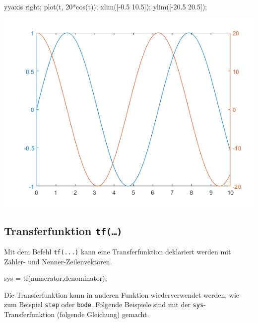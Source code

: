 \documentclass[
  10pt,
  a4paper,
  german]{article}
\newenvironment{Shaded}{}{}
\newcommand{\FloatTok}[1]{\textcolor[rgb]{0.00,0.36,0.77}{#1}}
\newcommand{\NormalTok}[1]{\textcolor[rgb]{0.14,0.16,0.18}{#1}}
\newcommand{\OperatorTok}[1]{\textcolor[rgb]{0.14,0.16,0.18}{#1}}
\newcommand{\VariableTok}[1]{\textcolor[rgb]{0.89,0.38,0.04}{#1}}
\numberwithin{equation}{section}
\begin{document}
\begin{multicols}{2}
\begin{Shaded}
\begin{Highlighting}[]
\VariableTok{yyaxis} \VariableTok{right}\OperatorTok{;}
\VariableTok{plot}\NormalTok{(}\VariableTok{t}\OperatorTok{,} \FloatTok{20}\OperatorTok{*}\VariableTok{cos}\NormalTok{(}\VariableTok{t}\NormalTok{))}\OperatorTok{;}
\VariableTok{xlim}\NormalTok{([}\OperatorTok{{-}}\FloatTok{0.5} \FloatTok{10.5}\NormalTok{])}\OperatorTok{;}
\VariableTok{ylim}\NormalTok{([}\OperatorTok{{-}}\FloatTok{20.5} \FloatTok{20.5}\NormalTok{])}\OperatorTok{;}
\end{Highlighting}
\end{Shaded}

\includegraphics{images/plotyy.png}

\hypertarget{transferfunktion-tf}{%
\subsection{\texorpdfstring{Transferfunktion
\texttt{tf(…)}}{Transferfunktion tf(\ldots)}}\label{transferfunktion-tf}}

Mit dem Befehl \texttt{tf(...)} kann eine Transferfunktion deklariert
werden mit Zähler- und Nenner-Zeilenvektoren.

\begin{Shaded}
\begin{Highlighting}[]
\VariableTok{sys} \OperatorTok{=} \VariableTok{tf}\NormalTok{(}\VariableTok{numerator}\OperatorTok{,}\VariableTok{denominator}\NormalTok{)}\OperatorTok{;}
\end{Highlighting}
\end{Shaded}

Die Transferfunktion kann in anderen Funktion wiederverwendet werden,
wie zum Beispiel \texttt{step} oder \texttt{bode}. Folgende Beispiele
sind mit der \texttt{sys}-Transferfunktion (folgende Gleichung) gemacht.


\end{multicols}
\end{document}
